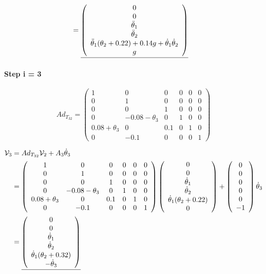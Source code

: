 \documentclass[]{scrreprt}
\newcommand{\myvec}[1]{\left(\begin{array}{c}#1\end{array}\right)}
\begin{document}
\begin{align*}
&= \underline{\myvec{0\\0\\\tddot{1}\\\tddot{2}\\\tddot{1}(\theta_2+0.22)+0.14g+\tdot{1}\tdot{2}\\g}}
\end{align*}    

\paragraph{Step i = 3}

\[
Ad_{T_{32}} = \left(\begin{array}{cccccc}
1 & 0 & 0 & 0 & 0 & 0 \\
0 & 1 & 0 & 0 & 0 & 0 \\
0 & 0 & 1 & 0 & 0 & 0 \\
0 & -0.08-\theta_3 & 0 & 1 & 0 & 0 \\
0.08+\theta_3 & 0 & 0.1 & 0 & 1 & 0 \\
0 & -0.1 & 0 & 0 & 0 & 1
\end{array}\right)
\]

\begin{align*}
\mathcal{V}_3 &= Ad_{T_{32}}\mathcal{V}_2 + A_3\dot{\theta}_3\\
& = \left(\begin{array}{cccccc}
1 & 0 & 0 & 0 & 0 & 0 \\
0 & 1 & 0 & 0 & 0 & 0 \\
0 & 0 & 1 & 0 & 0 & 0 \\
0 & -0.08-\theta_3 & 0 & 1 & 0 & 0 \\
0.08+\theta_3 & 0 & 0.1 & 0 & 1 & 0 \\
0 & -0.1 & 0 & 0 & 0 & 1
\end{array}\right)
\myvec{0 \\ 0 \\ \dot{\theta}_1\\ \dot{\theta}_2\\ \dot{\theta}_1(\theta_2+0.22)\\ 0}+
\myvec{0\\ 0\\ 0\\ 0\\ 0\\ -1}\tdot{3}\\
&= \underline{\myvec{0\\ 0\\ \tdot{1}\\\tdot{2}\\\dot{\theta}_1(\theta_2+0.32)\\-\tdot{3}}}
\end{align*}         
\end{document}
